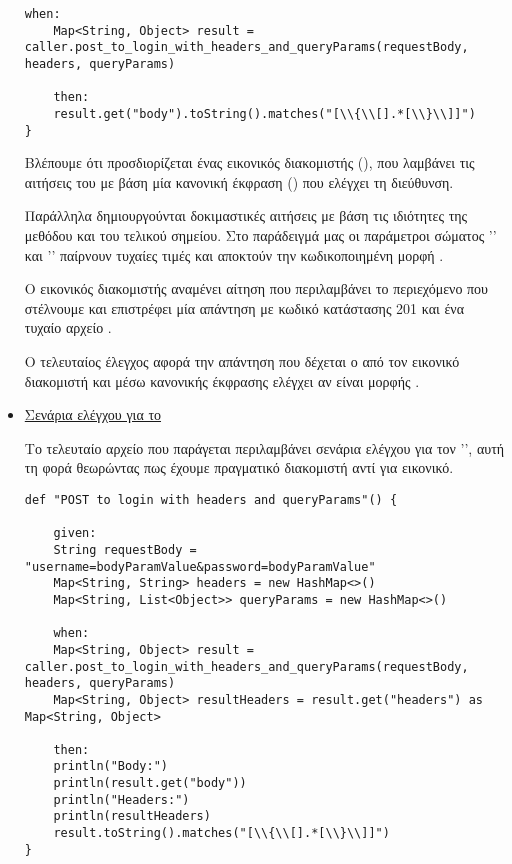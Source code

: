 \begin{itemize}
\begin{lstlisting}[deletekeywords={api,body}]
    when:
    Map<String, Object> result = caller.post_to_login_with_headers_and_queryParams(requestBody, headers, queryParams)

    then:
    result.get("body").toString().matches("[\\{\\[].*[\\}\\]]")
}
\end{lstlisting}

Βλέπουμε ότι προσδιορίζεται ένας εικονικός διακομιστής (),
που λαμβάνει τις αιτήσεις του 
με βάση μία κανονική έκφραση () που ελέγχει τη διεύθυνση.

Παράλληλα δημιουργούνται δοκιμαστικές αιτήσεις με βάση τις ιδιότητες της μεθόδου και του τελικού σημείου.
Στο παράδειγμά μας οι παράμετροι σώματος '' και '' παίρνουν τυχαίες τιμές 
και αποκτούν την κωδικοποιημένη μορφή .

Ο εικονικός διακομιστής αναμένει αίτηση που περιλαμβάνει το περιεχόμενο που στέλνουμε
και επιστρέφει μία απάντηση με κωδικό κατάστασης 201 και ένα τυχαίο αρχείο .

Ο τελευταίος έλεγχος αφορά την απάντηση που δέχεται ο  από τον εικονικό διακομιστή
και μέσω κανονικής έκφρασης ελέγχει αν είναι μορφής . 


        \item \underline{Σενάρια ελέγχου για το }
        
        Το τελευταίο αρχείο που παράγεται περιλαμβάνει σενάρια ελέγχου για τον '',
        αυτή τη φορά θεωρώντας πως έχουμε πραγματικό διακομιστή αντί για εικονικό.
\begin{lstlisting}[deletekeywords={body}]
def "POST to login with headers and queryParams"() {

    given:
    String requestBody = "username=bodyParamValue&password=bodyParamValue"
    Map<String, String> headers = new HashMap<>()
    Map<String, List<Object>> queryParams = new HashMap<>()

    when:
    Map<String, Object> result = caller.post_to_login_with_headers_and_queryParams(requestBody, headers, queryParams)
    Map<String, Object> resultHeaders = result.get("headers") as Map<String, Object>

    then:
    println("Body:")
    println(result.get("body"))
    println("Headers:")
    println(resultHeaders)
    result.toString().matches("[\\{\\[].*[\\}\\]]")
}
\end{lstlisting}


\end{itemize}

